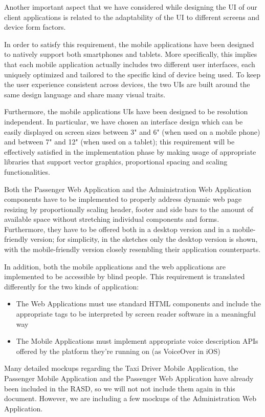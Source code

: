 Another important aspect that we have considered while designing the UI of our client applications is related to the adaptability of the UI to different screens and device form factors. 

In order to satisfy this requirement, the mobile applications have been designed to natively support both smartphones and tablets. More specifically, this implies that each mobile application actually includes two different user interfaces, each uniquely optimized and tailored to the specific kind of device being used. To keep the user experience consistent across devices, the two UIs are built around the same design language and share many visual traits. 

Furthermore, the mobile applications UIs have been designed to be resolution independent. In particular, we have chosen an interface design which can be easily displayed on screen sizes between 3" and 6" (when used on a mobile phone) and between 7" and 12" (when used on a tablet); this requirement will be effectively satisfied in the implementation phase by making usage of appropriate libraries that support vector graphics, proportional spacing and scaling functionalities.

Both the Passenger Web Application and the Administration Web Application components have to be implemented to properly address dynamic web page resizing by proportionally scaling header, footer and side bars to the amount of available space without stretching individual components and forms. Furthermore, they have to be offered both in a desktop version and in a mobile-friendly version; for simplicity, in the sketches only the desktop version is shown, with the mobile-friendly version closely resembling their application counterparts. 

In addition, both the mobile applications and the web applications are implemented to be accessible by blind people. This requirement is translated differently for the two kinds of application:
	\begin{itemize}
	\item The Web Applications must use standard HTML components and include the appropriate tags to be interpreted by screen reader software in a meaningful way
	\item The Mobile Applications must implement appropriate voice description APIs offered by the platform they're running on (as VoiceOver in iOS)
	\end{itemize}

Many detailed mockups regarding the Taxi Driver Mobile Application, the Passenger Mobile Application and the Passenger Web Application have already been included in the RASD, so we will not not include them again in this document. 
However, we are including a few mockups of the Administration Web Application. 

